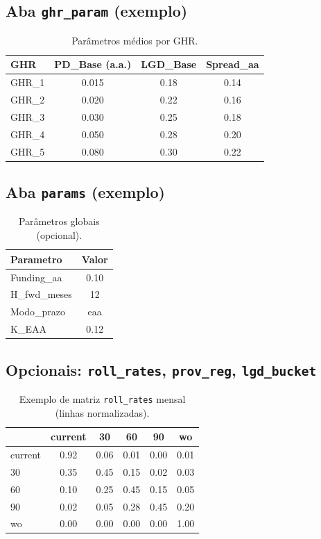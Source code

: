 \documentclass[11pt,a4paper]{article}
\newcommand{\1}{\mathbf{1}}
\begin{document}
\subsection*{Aba \texttt{ghr\_param} (exemplo)}
\begin{table}[H]\centering
\small
\begin{tabular}{lccc}
\toprule
GHR & PD\_Base (a.a.) & LGD\_Base & Spread\_aa \\
\midrule
GHR\_1 & 0.015 & 0.18 & 0.14 \\
GHR\_2 & 0.020 & 0.22 & 0.16 \\
GHR\_3 & 0.030 & 0.25 & 0.18 \\
GHR\_4 & 0.050 & 0.28 & 0.20 \\
GHR\_5 & 0.080 & 0.30 & 0.22 \\
\bottomrule
\end{tabular}
\caption{Parâmetros médios por GHR.}
\end{table}

\subsection*{Aba \texttt{params} (exemplo)}
\begin{table}[H]\centering
\small
\begin{tabular}{lc}
\toprule
Parametro & Valor \\
\midrule
Funding\_aa & 0.10 \\
H\_fwd\_meses & 12 \\
Modo\_prazo & eaa \\
K\_EAA & 0.12 \\
\bottomrule
\end{tabular}
\caption{Parâmetros globais (opcional).}
\end{table}

\subsection*{Opcionais: \texttt{roll\_rates}, \texttt{prov\_reg}, \texttt{lgd\_bucket}}
\begin{table}[H]\centering
\small
\begin{tabular}{lccccc}
\toprule
 & current & 30 & 60 & 90 & wo \\
\midrule
current & 0.92 & 0.06 & 0.01 & 0.00 & 0.01 \\
30      & 0.35 & 0.45 & 0.15 & 0.02 & 0.03 \\
60      & 0.10 & 0.25 & 0.45 & 0.15 & 0.05 \\
90      & 0.02 & 0.05 & 0.28 & 0.45 & 0.20 \\
wo      & 0.00 & 0.00 & 0.00 & 0.00 & 1.00 \\
\bottomrule
\end{tabular}
\caption{Exemplo de matriz \texttt{roll\_rates} mensal (linhas normalizadas).}
\end{table}
\end{document}
